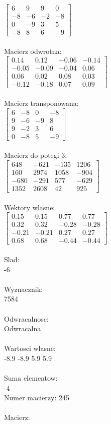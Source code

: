 \documentclass[a4paper,12pt]{article}
\begin{document}
$\begin{bmatrix} 6&9&9&0\\-8&-6&-2&-8\\0&-9&3&5\\-8&8&6&-9 \end{bmatrix}$
\\
\\
Macierz odwrotna:\\

$\begin{bmatrix} 0.14&0.12&-0.06&-0.14\\-0.05&-0.09&-0.04&0.06\\0.06&0.02&0.08&0.03\\-0.12&-0.18&0.07&0.09 \end{bmatrix}$
\\
\\
Macierz transponowana:\\

$\begin{bmatrix} 6&-8&0&-8\\9&-6&-9&8\\9&-2&3&6\\0&-8&5&-9 \end{bmatrix}$
\\
\\
Macierz do potegi 3:\\

$\begin{bmatrix} 648&-621&-135&1206\\160&2974&1058&-904\\-680&-291&577&-629\\1352&2608&42&925 \end{bmatrix}$
\\
\\
Wektory wlasne:\\

$\begin{bmatrix} 0.15&0.15&0.77&0.77\\0.32&0.32&-0.28&-0.28\\-0.21&-0.21&0.27&0.27\\0.68&0.68&-0.44&-0.44 \end{bmatrix}$
\\
\\
Slad:\\
-6
\\
\\
Wyznacznik:\\
7584
\\
\\
Odwracalnosc:\\
Odwracalna
\\
\\
Wartosci wlasne:\\
-8.9 -8.9 5.9 5.9
\\
\\
Suma elementow:\\
-4
\\
\newpage
Numer macierzy:
245
\\
\\
Macierz:\\
\end{document}
